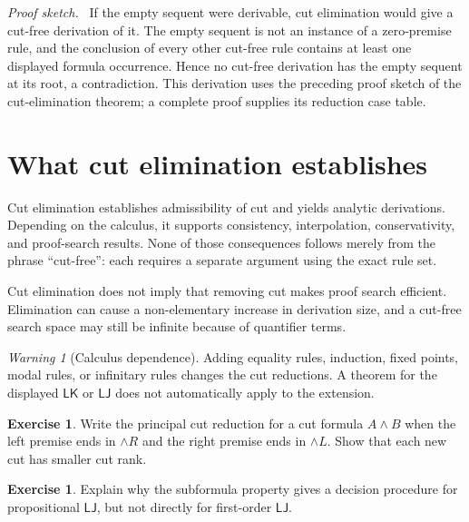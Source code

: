 \documentclass[11pt,oneside,openany]{book}
\theoremstyle{definition}
\newtheorem{exercise}[definition]{Exercise}
\theoremstyle{plain}
\theoremstyle{remark}
\newtheorem{warning}[definition]{Warning}
\newenvironment{proofplan}{\par\noindent\textit{Proof sketch.}\ }{\par}
\newcommand{\LK}{\mathsf{LK}}
\newcommand{\LJ}{\mathsf{LJ}}
\begin{document}
\begin{proofplan}
If the empty sequent were derivable, cut elimination would give a cut-free
derivation of it.  The empty sequent is not an instance of a zero-premise
rule, and the conclusion of every other cut-free rule contains at least one
displayed formula occurrence.  Hence no cut-free derivation has the empty
sequent at its root, a contradiction.
This derivation uses the preceding proof sketch of the cut-elimination
theorem; a complete proof supplies its reduction case table.
\end{proofplan}

\section{What cut elimination establishes}
\label{sec:cut-elimination-02}

Cut elimination establishes admissibility of cut and yields analytic
derivations.  Depending on the calculus, it supports consistency,
interpolation, conservativity, and proof-search results.  None of those
consequences follows merely from the phrase ``cut-free'': each requires a
separate argument using the exact rule set.

Cut elimination does not imply that removing cut makes proof search efficient.
Elimination can cause a non-elementary increase in derivation size, and a
cut-free search space may still be infinite because of quantifier terms.

\begin{warning}[Calculus dependence]
Adding equality rules, induction, fixed points, modal rules, or infinitary rules
changes the cut reductions.  A theorem for the displayed \(\LK\) or \(\LJ\)
does not automatically apply to the extension.
\end{warning}

\begin{exercise}
\label{ex:cut-elimination-01}
Write the principal cut reduction for a cut formula \(A\land B\) when the left
premise ends in \(\land R\) and the right premise ends in \(\land L\).  Show
that each new cut has smaller cut rank.
\end{exercise}

\begin{exercise}
\label{ex:cut-elimination-02}
Explain why the subformula property gives a decision procedure for
propositional \(\LJ\), but not directly for first-order \(\LJ\).
\end{exercise}
\end{document}
